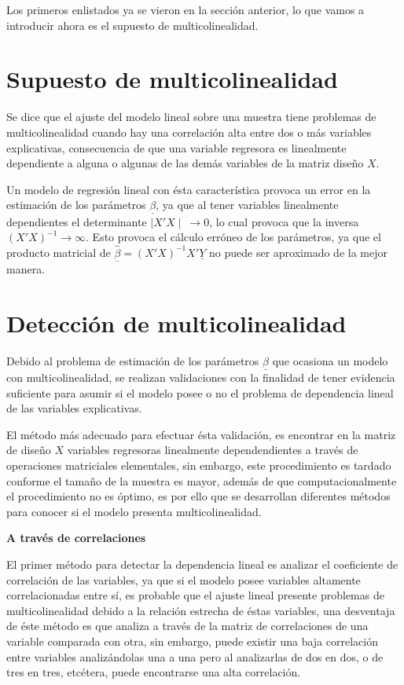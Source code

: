 \documentclass[
  a4paper,
  oneside,
  openany]{book}
\begin{document}
Los primeros enlistados ya se vieron en la sección anterior, lo que vamos a introducir ahora es el supuesto de multicolinealidad.

\hypertarget{supuesto-de-multicolinealidad}{%
\section{Supuesto de multicolinealidad}\label{supuesto-de-multicolinealidad}}

Se dice que el ajuste del modelo lineal sobre una muestra tiene problemas de multicolinealidad cuando hay una correlación alta entre dos o más variables explicativas, consecuencia de que una variable regresora es linealmente dependiente a alguna o algunas de las demás variables de la matriz diseño \(X\).

Un modelo de regresión lineal con ésta característica provoca un error en la estimación de los parámetros \(\underline{\beta}\), ya que al tener variables linealmente dependientes el determinante \(\mid X'X \mid \ \rightarrow 0\), lo cual provoca que la inversa \((X'X)^{-1} \rightarrow \infty\).
Esto provoca el cálculo erróneo de los parámetros, ya que el producto matricial de \(\underline{\hat{\beta}}=(X'X)^{-1}X'\underline{Y}\) no puede ser aproximado de la mejor manera.

\hypertarget{detecciuxf3n-de-multicolinealidad}{%
\section{Detección de multicolinealidad}\label{detecciuxf3n-de-multicolinealidad}}

Debido al problema de estimación de los parámetros \(\underline{\beta}\) que ocasiona un modelo con multicolinealidad, se realizan validaciones con la finalidad de tener evidencia suficiente para asumir si el modelo posee o no el problema de dependencia lineal de las variables explicativas.

El método más adecuado para efectuar ésta validación, es encontrar en la matriz de diseño \(X\) variables regresoras linealmente dependendientes a través de operaciones matriciales elementales, sin embargo, este procedimiento es tardado conforme el tamaño de la muestra es mayor, además de que computacionalmente el procedimiento no es óptimo, es por ello que se desarrollan diferentes métodos para conocer si el modelo presenta multicolinealidad.

\textbf{A través de correlaciones}

El primer método para detectar la dependencia lineal es analizar el coeficiente de correlación de las variables, ya que si el modelo posee variables altamente correlacionadas entre sí, es probable que el ajuste lineal presente problemas de multicolinealidad debido a la relación estrecha de éstas variables, una desventaja de éste método es que analiza a través de la matriz de correlaciones de una variable comparada con otra, sin embargo, puede existir una baja correlación entre variables analizándolas una a una pero al analizarlas de dos en dos, o de tres en tres, etcétera, puede encontrarse una alta correlación.
\end{document}
